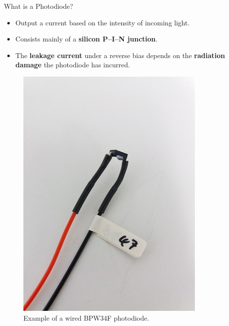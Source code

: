 \documentclass{beamer}
\begin{document}
    \begin{frame}{What is a Photodiode?}
        \begin{minipage}{0.5\linewidth}
            \begin{itemize}
                \item Output a current based on the intensity of incoming light.
                \vspace{0.5cm}
                \item Consists mainly of a \textbf{silicon P--I--N junction}.
                \vspace{0.5cm}
                \item The \textbf{leakage current} under a reverse bias depends on the \textbf{radiation damage} the photodiode has incurred.
            \end{itemize}
        \end{minipage}%
        \begin{minipage}{0.5\linewidth}
            \begin{figure}
            \includegraphics[width = 0.8\linewidth]{Photodiode.jpg}
            \caption{\scriptsize Example of a wired BPW34F photodiode.}
            \end{figure}
        \end{minipage}
    \end{frame}
        
\end{document}
